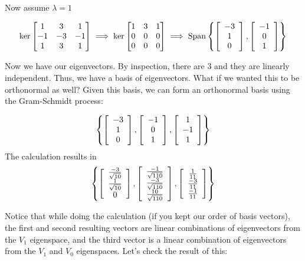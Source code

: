 \documentclass{article}
\begin{document}
    Now assume $\lambda = 1$

    \[\ker \begin{bmatrix}
        1 & 3 & 1 \\
        -1 & -3 & -1 \\
        1 & 3 & 1
    \end{bmatrix} \implies \ker \begin{bmatrix}
        1 & 3 & 1 \\
        0 & 0 & 0 \\
        0 & 0 & 0
    \end{bmatrix} \implies \operatorname{Span}\left\{\left[\begin{array}{c}-3 \\ 1 \\ 0\end{array}\right], \left[\begin{array}{c}-1 \\ 0 \\1\end{array}\right]\right\}\]

    Now we have our eigenvectors. By inspection, there are 3 and they are linearly independent. Thus, we have a basis of eigenvectors. What if we wanted this to be orthonormal as well?
    Given this basis, we can form an orthonormal basis using the Gram-Schmidt process:

    \[\left\{\left[\begin{array}{c}-3 \\ 1 \\ 0\end{array}\right], \left[\begin{array}{c}-1 \\ 0 \\1\end{array}\right], \left[\begin{array}{c}1 \\ -1 \\ 1\end{array}\right]\right\}\]
    The calculation results in 
    \[\left\{\left[\begin{array}{c}\frac{-3}{\sqrt{10}} \\ \frac{1}{\sqrt{10}} \\ 0\end{array}\right], \left[\begin{array}{c}\frac{-1}{\sqrt{110}} \\ \frac{-3}{\sqrt{110}} \\\frac{10}{\sqrt{110}}\end{array}\right], \left[\begin{array}{c}\frac{1}{11} \\ \frac{-3}{11} \\ \frac{-1}{11}\end{array}\right]\right\}\]

    Notice that while doing the calculation (if you kept our order of basis vectors), the first and second resulting vectors are linear combinations of eigenvectors from the $V_1$ eigenspace, and the third vector is a linear combination of eigenvectors from the $V_1$ and $V_0$ eigenspaces. Let's check the result of this:
\end{document}
